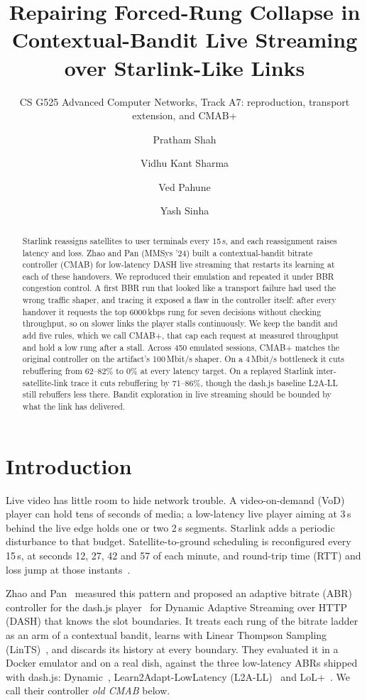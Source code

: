 \documentclass[sigconf]{acmart}
\title{Repairing Forced-Rung Collapse in Contextual-Bandit Live Streaming over Starlink-Like Links}
\subtitle{CS G525 Advanced Computer Networks, Track A7: reproduction, transport extension, and CMAB+}
\author{Pratham Shah}
\affiliation{%
  \position{2026H1030063P}
  \institution{BITS Pilani}
  \city{Pilani}
  \country{India}}
\author{Vidhu Kant Sharma}
\affiliation{%
  \position{2026H1030053P}
  \institution{BITS Pilani}
  \city{Pilani}
  \country{India}}
\author{Ved Pahune}
\affiliation{%
  \position{2026H1030056P}
  \institution{BITS Pilani}
  \city{Pilani}
  \country{India}}
\author{Yash Sinha}
\affiliation{%
  \position{Course Tutor}
  \institution{BITS Pilani}
  \city{Pilani}
  \country{India}}
\newcommand{\oldcmab}{old CMAB\xspace}
\newcommand{\kbps}{\,kbps\xspace}
\begin{document}
\begin{abstract}
Starlink reassigns satellites to user terminals every 15\,s, and each reassignment raises latency and loss. Zhao and Pan (MMSys '24) built a contextual-bandit bitrate controller (CMAB) for low-latency DASH live streaming that restarts its learning at each of these handovers. We reproduced their emulation and repeated it under BBR congestion control. A first BBR run that looked like a transport failure had used the wrong traffic shaper, and tracing it exposed a flaw in the controller itself: after every handover it requests the top 6000\kbps rung for seven decisions without checking throughput, so on slower links the player stalls continuously. We keep the bandit and add five rules, which we call CMAB+, that cap each request at measured throughput and hold a low rung after a stall. Across 450 emulated sessions, CMAB+ matches the original controller on the artifact's 100\,Mbit/s shaper. On a 4\,Mbit/s bottleneck it cuts rebuffering from 62--82\% to 0\% at every latency target. On a replayed Starlink inter-satellite-link trace it cuts rebuffering by 71--86\%, though the dash.js baseline L2A-LL still rebuffers less there. Bandit exploration in live streaming should be bounded by what the link has delivered.
\end{abstract}

\maketitle

\section{Introduction}

Live video has little room to hide network trouble. A video-on-demand (VoD) player can hold tens of seconds of media; a low-latency live player aiming at 3\,s behind the live edge holds one or two 2\,s segments. Starlink adds a periodic disturbance to that budget. Satellite-to-ground scheduling is reconfigured every 15\,s, at seconds 12, 27, 42 and 57 of each minute, and round-trip time (RTT) and loss jump at those instants~\cite{tanveer2023constellations,pan2023measuring}.

Zhao and Pan~\cite{zhao2024mmsys} measured this pattern and proposed an adaptive bitrate (ABR) controller for the dash.js player~\cite{dashjs} for Dynamic Adaptive Streaming over HTTP (DASH) that knows the slot boundaries. It treats each rung of the bitrate ladder as an arm of a contextual bandit, learns with Linear Thompson Sampling (LinTS)~\cite{agrawal2013thompson}, and discards its history at every boundary. They evaluated it in a Docker emulator and on a real dish, against the three low-latency ABRs shipped with dash.js: Dynamic~\cite{spiteri2019dynamic}, Learn2Adapt-LowLatency (L2A-LL)~\cite{karagkioules2020l2a} and LoL+~\cite{bentaleb2022lolp}. We call their controller \emph{\oldcmab} below.
\end{document}
